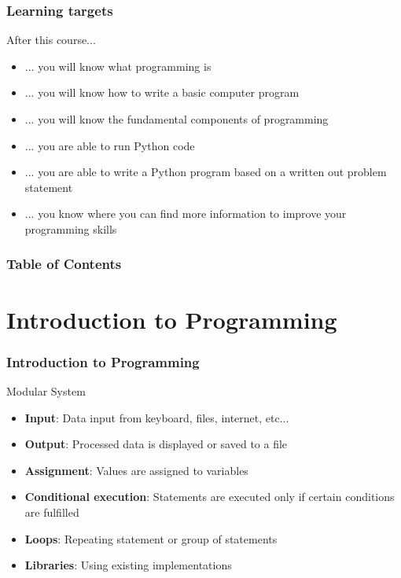 \documentclass[10pt, a4paper]{beamer} %
\begin{document}
\begin{frame}[t]\frametitle{Learning targets}
    
After this course...
\begin{itemize}
    \item ... you will know what programming is
    \item ... you will know how to write a basic computer program
    \item ... you will know the fundamental components of programming
    \item ... you are able to run Python code
    \item ... you are able to write a Python program based on a written out
    problem statement
    \item ... you know where you can find more information to improve your
    programming skills
\end{itemize}
\end{frame}


\begin{frame}[t]\frametitle{Table of Contents}
    \tableofcontents
\end{frame}

\section{Introduction to Programming} %
\label{sec:introduction_to_programming}

\begin{frame}[c]\frametitle{Introduction to Programming}
\begin{block}{Modular System}
    \begin{itemize}
        \item \textbf{Input}: Data input from keyboard, files, internet, etc...
        \item \textbf{Output}: Processed data is displayed or saved to a file
        \item \textbf{Assignment}: Values are assigned to variables
        \item \textbf{Conditional execution}: Statements are executed only if certain
        conditions are fulfilled
        \item \textbf{Loops}: Repeating statement or group of statements
        \item \textbf{Libraries}: Using existing implementations
    \end{itemize}

\end{block}     
\end{frame}
\end{document}
